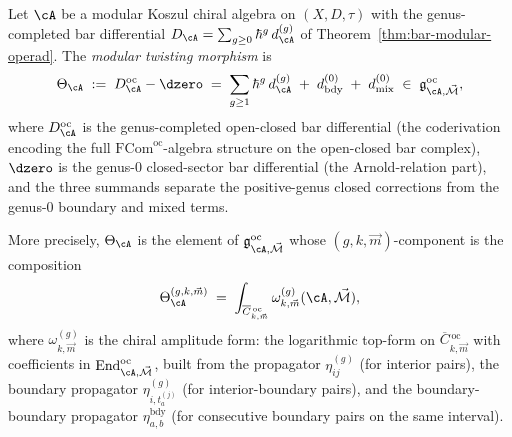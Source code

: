 \begin{definition}
\label{def:modular-twisting-morphism-oc}
Let $\cA$ be a modular Koszul chiral algebra on $(X, D, \tau)$
with the genus-completed bar differential
$D_\cA = \sum_{g \geq 0} \hbar^g\, d_\cA^{(g)}$ of
Theorem~\ref{thm:bar-modular-operad}. The
\emph{modular twisting morphism} is
\begin{equation}\label{eq:theta-oc}
\Theta_\cA
\;:=\;
D_\cA^{\mathrm{oc}} - \dzero
\;=\;
\sum_{g \geq 1} \hbar^g\, d_\cA^{(g)}
\;+\;
d_{\mathrm{bdy}}^{(0)}
\;+\;
d_{\mathrm{mix}}^{(0)}
\;\in\;
\mathfrak{g}^{\mathrm{oc}}_{\cA, \vec{\mathcal{M}}},
\end{equation}
where $D_\cA^{\mathrm{oc}}$ is the genus-completed open-closed
bar differential (the coderivation encoding the full
$\mathrm{FCom}^{\mathrm{oc}}$-algebra structure on the
open-closed bar complex), $\dzero$ is the genus-$0$ closed-sector
bar differential (the Arnold-relation part), and the three
summands separate the positive-genus closed corrections from the
genus-$0$ boundary and mixed terms.

More precisely, $\Theta_\cA$ is the element of
$\mathfrak{g}^{\mathrm{oc}}_{\cA, \vec{\mathcal{M}}}$ whose
$(g, k, \vec{m})$-component is the composition
\begin{equation}\label{eq:theta-components}
\Theta_\cA^{(g, k, \vec{m})}
\;=\;
\int_{\overline{C}{}^{\,\mathrm{oc}}_{k,\vec{m}}}
\omega^{(g)}_{k, \vec{m}}(\cA, \vec{\mathcal{M}}),
\end{equation}
where $\omega^{(g)}_{k, \vec{m}}$ is the chiral amplitude form:
the logarithmic top-form on
$\overline{C}{}^{\,\mathrm{oc}}_{k,\vec{m}}$ with
coefficients in
$\operatorname{End}^{\mathrm{oc}}_{\cA, \vec{\mathcal{M}}}$,
built from the propagator $\eta^{(g)}_{ij}$ (for interior pairs),
the boundary propagator $\eta^{(g)}_{i, t_a^{(j)}}$ (for
interior-boundary pairs), and the boundary-boundary propagator
$\eta^{\mathrm{bdy}}_{a,b}$ (for consecutive boundary pairs on
the same interval).
\end{definition}

